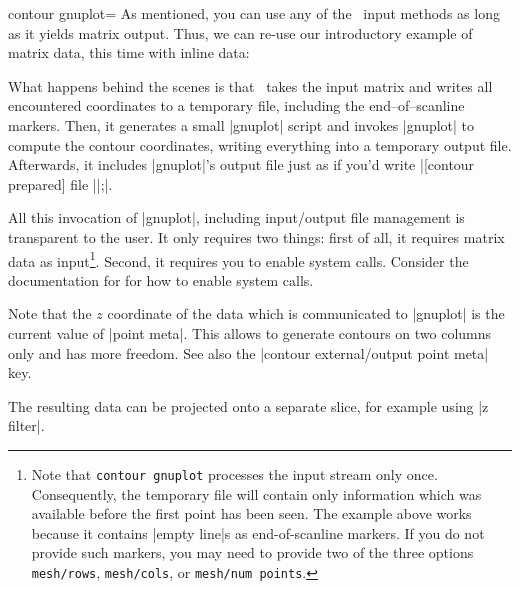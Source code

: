 {{\begin{plottype}[/pgfplots]{contour gnuplot=\textcolor{black}{}}
As mentioned, you can use any of the \PGFPlots\ input methods as long as it yields matrix output. Thus, we can re-use our introductory example of matrix data, this time with inline data:
\pgfplotsexpensiveexample
\begin{codeexample}[]%
%
\end{codeexample}
	\noindent 

	What happens behind the scenes is that \PGFPlots\ takes the input matrix and writes all encountered coordinates to a temporary file, including the end--of--scanline markers. Then, it generates a small |gnuplot| script and invokes |gnuplot| to compute the contour coordinates, writing everything into a temporary output file. Afterwards, it includes |gnuplot|'s output file just as if you'd write |[contour prepared] file ||;|.

	All this invocation of |gnuplot|, including input/output file management is transparent to the user. It only requires two things: first of all, it requires matrix data as input\footnote{Note that \texttt{contour gnuplot} processes the input stream only once. Consequently, the temporary file will contain only information which was available before the first point has been seen. The example above works because it contains |empty line|s as end-of-scanline markers. If you do not provide such markers, you may need to provide two of the three options \texttt{mesh/rows}, \texttt{mesh/cols}, or \texttt{mesh/num points}.}. Second, it requires you to enable system calls. Consider the documentation for  for how to enable system calls.

	Note that the $z$ coordinate of the data which is communicated to |gnuplot| is the current value of |point meta|. This allows to generate contours on two columns only and has more freedom. See also the |contour external/output point meta| key.

	The resulting data can be projected onto a separate slice, for example using |z filter|.
\pgfplotsexpensiveexample
\begin{codeexample}[]%
\end{codeexample}
\end{plottype}}}
